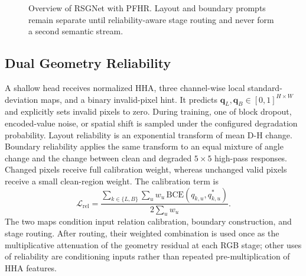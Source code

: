\documentclass[a4paper,fleqn]{cas-dc}
\begin{document}
\begin{figure}%
  \centering
    \caption{Overview of RSGNet with PFHR. Layout and boundary prompts remain separate until reliability-aware stage routing and never form a second semantic stream.}\label{fig:overview}
\end{figure}

\subsection{Dual Geometry Reliability}

A shallow head receives normalized HHA, three channel-wise local standard-deviation maps, and a binary invalid-pixel hint. It predicts $\mathbf{q}_{L},\mathbf{q}_{B}\in[0,1]^{H\times W}$ and explicitly sets invalid pixels to zero. During training, one of block dropout, encoded-value noise, or spatial shift is sampled under the configured degradation probability. Layout reliability is an exponential transform of mean D-H change. Boundary reliability applies the same transform to an equal mixture of angle change and the change between clean and degraded $5\times5$ high-pass responses. Changed pixels receive full calibration weight, whereas unchanged valid pixels receive a small clean-region weight. The calibration term is
\begin{equation}
  \mathcal{L}_{\mathrm{rel}}
  =
  \frac{\sum_{k\in\{L,B\}}\sum_{u}w_u\,
  \mathrm{BCE}(q_{k,u},q_{k,u}^{*})}
       {2\sum_{u}w_u}.
\end{equation}
The two maps condition input relation calibration, boundary construction, and stage routing. After routing, their weighted combination is used once as the multiplicative attenuation of the geometry residual at each RGB stage; other uses of reliability are conditioning inputs rather than repeated pre-multiplication of HHA features.
\end{document}
